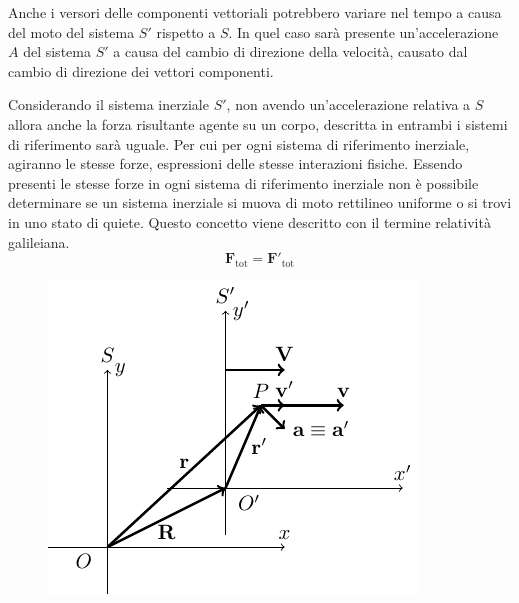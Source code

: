 \documentclass{article}
\newcommand{\vect}[1]{\boldsymbol{\mathbf{#1}}}
\numberwithin{equation}{subsection}
\begin{document}
Anche i versori delle componenti vettoriali potrebbero variare nel 
tempo a causa del moto del sistema $S'$ rispetto a $S$. In quel 
caso sarà presente un'accelerazione $A$ del sistema $S'$ a 
causa del cambio di direzione della velocità, causato dal cambio 
di direzione dei vettori componenti. 


Considerando il sistema 
inerziale $S'$, non avendo un'accelerazione relativa a $S$ 
allora anche la forza risultante agente su un corpo, descritta 
in entrambi i sistemi di riferimento sarà uguale. Per cui per ogni sistema di riferimento inerziale, agiranno le stesse forze, espressioni delle stesse interazioni fisiche. 
Essendo presenti le stesse forze in ogni sistema di riferimento inerziale non è possibile determinare se un sistema inerziale si muova 
di moto rettilineo uniforme o si trovi in uno stato di quiete. Questo concetto viene descritto con il termine relatività galileiana. 
\begin{equation}
    \vect{F}_\mathrm{tot}=\vect{F}'_\mathrm{tot}
\end{equation}

\begin{figure}[H]%
    \centering
    \includegraphics{inerziali-1.pdf}%
\end{figure}
\end{document}
